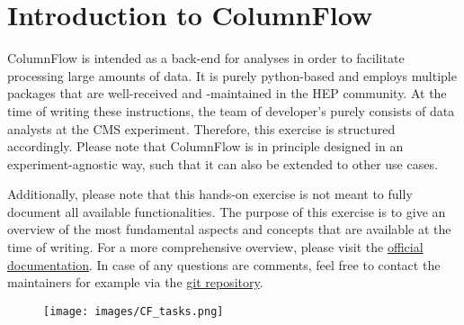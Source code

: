 \chapter{Introduction to ColumnFlow}

ColumnFlow is intended as a back-end for analyses in order to facilitate processing large amounts of data.
It is purely python-based and employs multiple packages that are well-received and {-maintained} in the HEP community.
At the time of writing these instructions, the team of developer's purely consists of data analysts at the CMS experiment.
Therefore, this exercise is structured accordingly.
Please note that ColumnFlow is in principle designed in an experiment-agnostic way, such that it can also be extended to other use cases.

Additionally, please note that this hands-on exercise is not meant to fully document all available functionalities.
The purpose of this exercise is to give an overview of the most fundamental aspects and concepts that are available at the time of writing.
For a more comprehensive overview, please visit the \href{https://columnflow.readthedocs.io/en/latest/}{official documentation}. %
In case of any questions are comments, feel free to contact the maintainers for example via the \href{https://github.com/columnflow/columnflow}{git repository}.

\begin{figure}[p]
	\centering
	\texttt{[image: images/CF\_tasks.png]}
	\caption{}
	\label{fig:task_graph}
\end{figure}